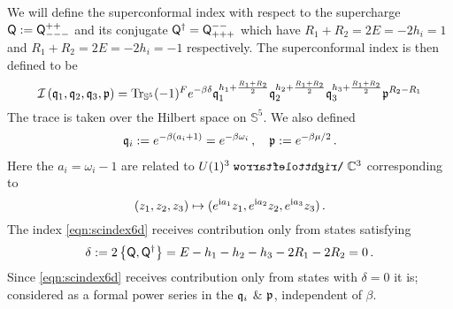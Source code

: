\documentclass[main.tex]{subfiles}
\begin{document}
We will define the superconformal index with respect to the supercharge $\mathsf{Q}:=\mathsf{Q}^{++}_{---}$ and its conjugate $\mathsf{Q}^{\dagger}=\mathsf{Q}^{--}_{+++}$ which have $R_1+R_2=2E=-2h_i=1$ and $R_1+R_2=2E=-2h_i=-1$ respectively.  The superconformal index is then defined to be \cite{Bhattacharya:2008zy,Kim:2012ava,Kinney:2005ej,Lockhart:2012vp,Romelsberger:2005eg,Bak:2016vpi}
\begin{equation}\label{eqn:scindex6d}
\mathcal{I}\left(\mathfrak{q}_1,\mathfrak{q}_2,\mathfrak{q}_3,\mathfrak{p}\right)=\operatorname{Tr}_{\mathbb{S}^5}(-1)^Fe^{-\beta\delta}\mathfrak{q}_1^{h_1+\frac{R_1+R_2}{2}}\mathfrak{q}_2^{h_2+\frac{R_1+R_2}{2}}\mathfrak{q}_3^{h_3+\frac{R_1+R_2}{2}}\mathfrak{p}^{R_2-R_1}
\end{equation}
The trace is taken over the Hilbert space on $\mathbb{S}^5$.  We also defined 
\begin{align}\label{eqn:indexparamas}
\mathfrak{q}_i:=e^{-\beta(a_i+1)}=e^{-\beta\omega_i}\,,\quad\mathfrak{p}:=e^{-\beta\mu/2}\,.
\end{align}
Here the $a_i=\omega_i-1$ are related to $U(1)^3\acts\mathbb{C}^3$ corresponding to
\begin{equation}\label{eqn:u13action}
(z_1,z_2,z_3)\mapsto(e^{\mathrm{i} a_1}z_1,e^{\mathrm{i} a_2}z_2,e^{\mathrm{i} a_3}z_3)\,.
\end{equation}
The index \eqref{eqn:scindex6d} receives contribution only from states satisfying
\begin{equation}
\delta:=2\left\{\mathsf{Q},\mathsf{Q}^{\dagger}\right\}=E-h_1-h_2-h_3-2R_1-2R_2=0\,.
\end{equation}
Since \eqref{eqn:scindex6d} receives contribution only from states with $\delta=0$ it is; considered as a formal power series in the $\mathfrak{q}_i$ \& $\mathfrak{p}$, independent of $\beta$.  
\end{document}
